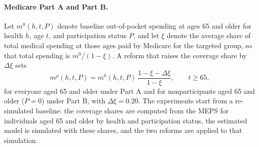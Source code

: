 \paragraph{Medicare Part A and Part B.}
Let $m^{0}(h,t,P)$ denote baseline out-of-pocket spending at ages 65 and older for health $h$, age $t$, and participation status $P$, and let $\xi$ denote the average share of total medical spending at those ages paid by Medicare for the targeted group, so that total spending is $m^{0}/(1-\xi)$. %
A reform that raises the coverage share by $\Delta\xi$ sets
\begin{equation}\label{eq:medreform}
m^{\rho}(h,t,P)=m^{0}(h,t,P)\,\frac{1-\xi-\Delta\xi}{1-\xi},\qquad t\geq 65,
\end{equation}
for everyone aged 65 and older under Part A and for nonparticipants aged 65 and older ($P=0$) under Part B, with $\Delta\xi=0.20$. %
The experiments start from a re-simulated baseline: the coverage shares are computed from the MEPS for individuals aged 65 and older by health and participation status, the estimated model is simulated with these shares, and the two reforms are applied to that simulation. %

